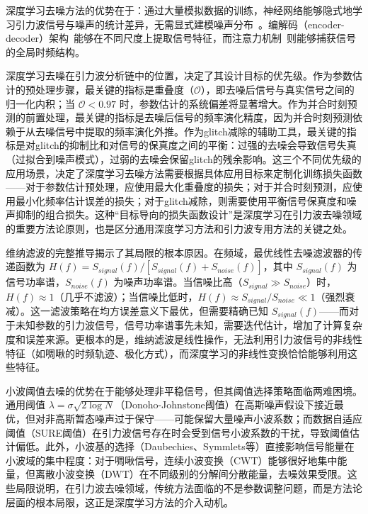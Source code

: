 深度学习去噪方法的优势在于：通过大量模拟数据的训练，神经网络能够隐式地学习引力波信号与噪声的统计差异，无需显式建模噪声分布~\cite{Wei2020denoising,Chatterjee2021denoising}。编解码（encoder-decoder）架构~\cite{Ronneberger2015UNet}能够在不同尺度上提取信号特征，而注意力机制~\cite{Vaswani2017Transformer}则能够捕获信号的全局时频结构。

深度学习去噪在引力波分析链中的位置，决定了其设计目标的优先级。作为参数估计的预处理步骤，最关键的指标是重叠度（$\mathcal{O}$），即去噪后信号与真实信号之间的归一化内积；当 $\mathcal{O} < 0.97$ 时，参数估计的系统偏差将显著增大。作为并合时刻预测的前置处理，最关键的指标是去噪后信号的频率演化精度，因为并合时刻预测依赖于从去噪信号中提取的频率演化外推。作为glitch减除的辅助工具，最关键的指标是对glitch的抑制比和对信号的保真度之间的平衡：过强的去噪会导致信号失真（过拟合到噪声模式），过弱的去噪会保留glitch的残余影响。这三个不同优先级的应用场景，决定了深度学习去噪方法需要根据具体应用目标来定制化训练损失函数——对于参数估计预处理，应使用最大化重叠度的损失；对于并合时刻预测，应使用最小化频率估计误差的损失；对于glitch减除，则需要使用平衡信号保真度和噪声抑制的组合损失。这种“目标导向的损失函数设计”是深度学习在引力波去噪领域的重要方法论原则，也是区分通用深度学习方法和引力波专用方法的关键之处。

维纳滤波的完整推导揭示了其局限的根本原因。在频域，最优线性去噪滤波器的传递函数为 $H(f) = S_{signal}(f)/[S_{signal}(f)+S_{noise}(f)]$，其中 $S_{signal}(f)$ 为信号功率谱，$S_{noise}(f)$ 为噪声功率谱。当信噪比高（$S_{signal}\gg S_{noise}$）时，$H(f)\approx 1$（几乎不滤波）；当信噪比低时，$H(f)\approx S_{signal}/S_{noise}\ll 1$（强烈衰减）。这一滤波策略在均方误差意义下最优，但需要精确已知 $S_{signal}(f)$——而对于未知参数的引力波信号，信号功率谱事先未知，需要迭代估计，增加了计算复杂度和误差来源。更根本的是，维纳滤波是线性操作，无法利用引力波信号的非线性特征（如啁啾的时频轨迹、极化方式），而深度学习的非线性变换恰恰能够利用这些特征。

小波阈值去噪的优势在于能够处理非平稳信号，但其阈值选择策略面临两难困境。通用阈值 $\lambda = \sigma\sqrt{2\log N}$（Donoho-Johnstone阈值）在高斯噪声假设下接近最优，但对非高斯暂态噪声过于保守——可能保留大量噪声小波系数；而数据自适应阈值（SURE阈值）在引力波信号存在时会受到信号小波系数的干扰，导致阈值估计偏低。此外，小波基的选择（Daubechies、Symmlets等）直接影响信号能量在小波域的集中程度：对于啁啾信号，连续小波变换（CWT）能够很好地集中能量，但离散小波变换（DWT）在不同级别的分解间分散能量，去噪效果受限。这些局限说明，在引力波去噪领域，传统方法面临的不是参数调整问题，而是方法论层面的根本局限，这正是深度学习方法的介入动机。

